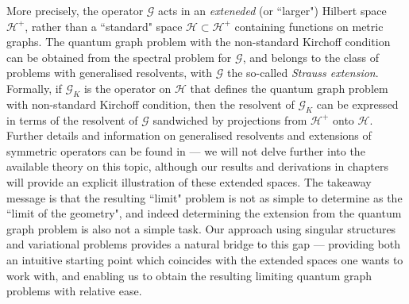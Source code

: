 More precisely, the operator $\mathcal{G}$ acts in an \emph{exteneded} (or ``larger") Hilbert space $\mathcal{H}^+$, rather than a ``standard" space $\mathcal{H}\subset\mathcal{H}^+$ containing functions on metric graphs.
The quantum graph problem with the non-standard Kirchoff condition can be obtained from the spectral problem for $\mathcal{G}$, and belongs to the class of problems with generalised resolvents, with $\mathcal{G}$ the so-called \emph{Strauss extension}.
Formally, if $\mathcal{G}_K$ is the operator on $\mathcal{H}$ that defines the quantum graph problem with non-standard Kirchoff condition, then the resolvent of $\mathcal{G}_K$ can be expressed in terms of the resolvent of $\mathcal{G}$ sandwiched by projections from $\mathcal{H}^+$ onto $\mathcal{H}$.
Further details and information on generalised resolvents and extensions of symmetric operators can be found in \cite{strauss1999function} --- we will not delve further into the available theory on this topic, although our results and derivations in chapters  will provide an explicit illustration of these extended spaces.
The takeaway message is that the resulting ``limit" problem is not as simple to determine as the ``limit of the geometry", and indeed determining the extension from the quantum graph problem is also not a simple task.
Our approach using singular structures and variational problems provides a natural bridge to this gap --- providing both an intuitive starting point which coincides with the extended spaces one wants to work with, and enabling us to obtain the resulting limiting quantum graph problems with relative ease.

